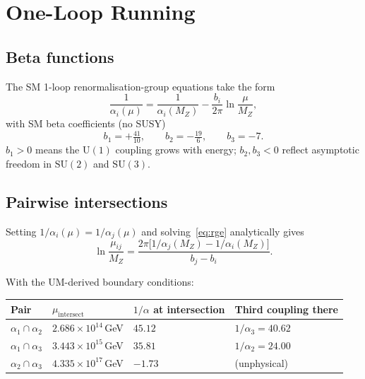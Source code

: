\documentclass[12pt]{article}
\begin{document}
\section{One-Loop Running}

\subsection{Beta functions}

The SM 1-loop renormalisation-group equations take the form
\begin{equation}
  \frac{1}{\alpha_i(\mu)}
  = \frac{1}{\alpha_i(M_Z)}
    - \frac{b_i}{2\pi}\ln\!\frac{\mu}{M_Z},
  \label{eq:rge}
\end{equation}
with SM beta coefficients (no SUSY)
\begin{equation}
  b_1 = +\tfrac{41}{10},\qquad
  b_2 = -\tfrac{19}{6},\qquad
  b_3 = -7.
  \label{eq:betas}
\end{equation}
$b_1 > 0$ means the $\mathrm{U}(1)$ coupling grows with energy;
$b_2, b_3 < 0$ reflect asymptotic freedom in $\mathrm{SU}(2)$ and
$\mathrm{SU}(3)$.

\subsection{Pairwise intersections}

Setting $1/\alpha_i(\mu) = 1/\alpha_j(\mu)$ and solving~\eqref{eq:rge}
analytically gives
\begin{equation}
  \ln\!\frac{\mu_{ij}}{M_Z}
  = \frac{2\pi\bigl[1/\alpha_j(M_Z) - 1/\alpha_i(M_Z)\bigr]}{b_j - b_i}.
  \label{eq:intersect}
\end{equation}

With the UM-derived boundary conditions:

\begin{center}
\begin{tabular}{llll}
\toprule
Pair & $\mu_{\text{intersect}}$ & $1/\alpha$ at intersection & Third coupling there \\
\midrule
$\alpha_1 \cap \alpha_2$ & $2.686\times10^{14}$\,GeV & $45.12$ & $1/\alpha_3 = 40.62$ \\
$\alpha_1 \cap \alpha_3$ & $3.443\times10^{15}$\,GeV & $35.81$ & $1/\alpha_2 = 24.00$ \\
$\alpha_2 \cap \alpha_3$ & $4.335\times10^{17}$\,GeV & $-1.73$ & (unphysical) \\
\bottomrule
\end{tabular}
\end{center}
\end{document}
